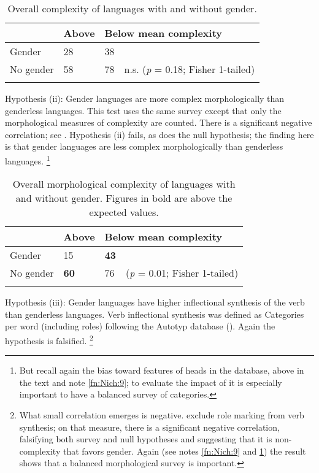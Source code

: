\documentclass[output=collectionpaper]{langsci/langscibook}
\begin{document}
\begin{table}
\caption{Overall complexity of languages with and without gender.}
\label{extab:Nich:9}
\begin{tabularx}{\textwidth}{p{2.7cm}Xp{1.3cm}l}
\lsptoprule
		 &	Above  &		\multicolumn{2}{l}{Below mean complexity} \\
			 \midrule
	Gender &		28		 &38 \\
	No gender	 & 58	 &	78	& n.s. (\textit{p} = 0.18; Fisher 1-tailed) \\
\lspbottomrule\end{tabularx}
\end{table}

Hypothesis (ii): Gender languages are more complex morphologically than genderless languages.  This test uses the same survey except that only the morphological measures of complexity are counted. There is a significant negative correlation; see . Hypothesis (ii) fails, as does the null hypothesis; the finding here is that gender languages are less complex morphologically than genderless languages.%
\footnote{%
\label{fn:Nich:10}%
But recall again the bias toward features of heads in the database, above in the text and note \ref{fn:Nich:9}; to evaluate the impact of  it is especially important to have a balanced survey of categories.}%

\begin{table}
\caption{Overall morphological complexity of languages with and without gender. Figures in bold are above the expected values.}
\label{extab:Nich:10}

\begin{tabularx}{\textwidth}{p{2.7cm}Xp{1.3cm}l}
\lsptoprule
		 &	Above  &		\multicolumn{2}{l}{Below mean complexity} \\
			 \midrule
	Gender	 &	15	 &	\textbf{43} \\
	No gender	 &\textbf{60}		 &76		 & (\textit{p} = 0.01; Fisher 1-tailed)
\\\lspbottomrule\end{tabularx}
\end{table}
 
 \largerpage
Hypothesis (iii): Gender languages have higher inflectional synthesis of the verb than genderless languages. Verb inflectional synthesis was defined as Categories per word (including roles) following the Autotyp database (\citealt{Bickel2017}). Again the hypothesis is falsified.%
\footnote{%
What small correlation emerges is negative. \citet{Bickel2013} exclude role marking from verb synthesis; on that measure, there is a significant negative correlation, falsifying both survey and null hypotheses and suggesting that it is non-complexity that favors gender. Again (see notes \ref{fn:Nich:9} and \ref{fn:Nich:10}) the result shows that a balanced morphological survey is important.
}%
\clearpage
\end{document}
